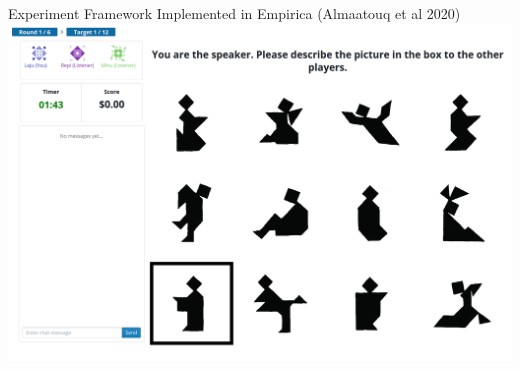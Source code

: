 \documentclass[ 12pt, xcolor=beamer,table,usenames,dvipsnames, ignorenonframetext, ngerman]{beamer}
\begin{document}
\begin{frame}{Experiment Framework}
Implemented in Empirica (Almaatouq et al 2020) 
 \includegraphics[width=\textwidth]{../images/interface.PNG}
\end{frame}
\end{document}
